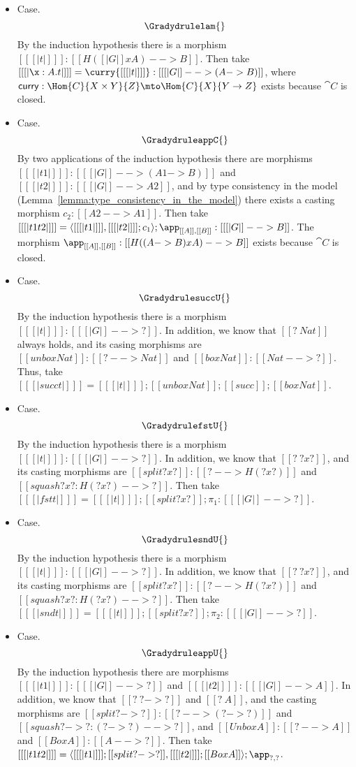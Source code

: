 \begin{itemize}
\item[] Case.
  \[
  \Gradydrulelam{}
  \] 
  By the induction hypothesis there is a morphism $[[ [| t |] ]] :
  [[ H([| G |] x A) --> B]]$.  Then take $[[ [| \x : A.t |] ]] =
  \curry {[[ [| t |] ]]} : [[ [| G |] --> (A -> B)]]$, where
  $\mathsf{curry} : \Hom{C}{X \times Y}{Z} \mto \Hom{C}{X}{Y \to Z}$
  exists because $\cat{C}$ is closed.

\item[] Case.
  \[
  \GradydruleappC{}
  \]
  By two applications of the induction hypothesis there are
  morphisms $[[ [| t1 |] ]] : [[ [| G |] --> (A1 -> B)]]$ and $[[ [|
        t2 |] ]] : [[ [| G |] --> A2]]$, and by type consistency in the model
  (Lemma~\ref{lemma:type_consistency_in_the_model}) there exists a
  casting morphism $c_2 : [[A2 --> A1]]$.
  Then take $[[ [| t1 t2 |] ]] = \langle [[ [| t1 |] ]] , [[ [| t2 |] ]];c_1 \rangle ; \app_{[[A]],[[B]]} : [[ [| G |] --> B]]$.
  The morphism $\app_{[[A]],[[B]]} : [[ H((A -> B) x A) --> B]]$ exists because $\cat{C}$ is closed.
  
\item[] Case.
  \[
  \GradydrulesuccU{}
  \]
  By the induction hypothesis there is a morphism $[[ [| t |] ]] :
  [[ [| G |] --> ?]]$.  In addition, we know that $[[? ~ Nat]]$
  always holds, and its casing morphisms are $[[unbox Nat]] : [[? -->
      Nat]]$ and $[[box Nat]] : [[Nat --> ?]]$.
  Thus, take $[[ [| succ t |] ]] = [[ [| t |] ]];[[unbox Nat]];[[succ]];[[box Nat]]$.

\item[] Case.
  \[
  \GradydrulefstU{}
  \]
  By the induction hypothesis there is a morphism $[[ [| t |] ]] :
  [[ [| G |] --> ?]]$.  In addition, we know that $[[? ~ ? x ?]]$, and its casting morphisms are
  $[[split ? x ?]] : [[? --> H(? x ?)]]$ and $[[squash ? x ? : H(? x ?) --> ?]]$.
  Then take $[[ [| fst t |] ]] = [[ [| t |] ]];[[split ? x ?]];\pi_1 : [[ [| G |] --> ?]]$.
  
\item[] Case.
  \[
  \GradydrulesndU{}
  \]
  By the induction hypothesis there is a morphism $[[ [| t |] ]] :
  [[ [| G |] --> ?]]$.  In addition, we know that $[[? ~ ? x ?]]$, and its casting morphisms are
  $[[split ? x ?]] : [[? --> H(? x ?)]]$ and $[[squash ? x ? : H(? x ?) --> ?]]$.
  Then take $[[ [| snd t |] ]] = [[ [| t |] ]];[[split ? x ?]];\pi_2 : [[ [| G |] --> ?]]$.    
  
\item[] Case.
  \[
  \GradydruleappU{}
  \]
  By the induction hypothesis there are morphisms $[[ [| t1 |] ]] : [[ [| G |] --> ?]]$
  and $[[ [| t2 |] ]] : [[ [| G |] --> A]]$.  In addition, we know that $[[? ~ ? -> ?]]$ and $[[? ~ A]]$, and the
  casting morphisms are
  $[[split ? -> ?]] : [[? --> (? -> ?)]]$ and $[[squash ? -> ? : (? -> ?) --> ?]]$, and
  $[[Unbox A]] : [[? --> A]]$ and $[[Box A]] : [[A --> ?]]$.  
  Then take $[[ [| t1 t2 |] ]] = \langle [[ [| t1 |] ]];[[split ? -> ?]] , [[ [| t2 |] ]];[[Box A]] \rangle;\app_{?,?}$.
\end{itemize}

